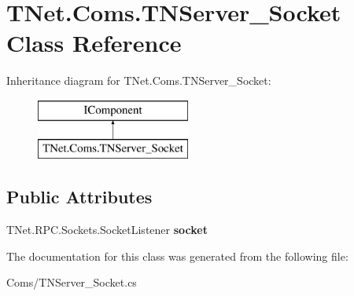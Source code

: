 \hypertarget{class_t_net_1_1_coms_1_1_t_n_server___socket}{}\section{T\+Net.\+Coms.\+T\+N\+Server\+\_\+\+Socket Class Reference}
\label{class_t_net_1_1_coms_1_1_t_n_server___socket}
Inheritance diagram for T\+Net.\+Coms.\+T\+N\+Server\+\_\+\+Socket\+:\begin{figure}[H]
\begin{center}
\leavevmode
\includegraphics[height=2.000000cm]{class_t_net_1_1_coms_1_1_t_n_server___socket}
\end{center}
\end{figure}
\subsection*{Public Attributes}
\begin{DoxyCompactItemize}
\item 
\mbox{\label{class_t_net_1_1_coms_1_1_t_n_server___socket_a28a9bf5aad275dd75a76d77e843965ac}} 
T\+Net.\+R\+P\+C.\+Sockets.\+Socket\+Listener {\bfseries socket}
\end{DoxyCompactItemize}


The documentation for this class was generated from the following file\+:\begin{DoxyCompactItemize}
\item 
Coms/T\+N\+Server\+\_\+\+Socket.\+cs\end{DoxyCompactItemize}
